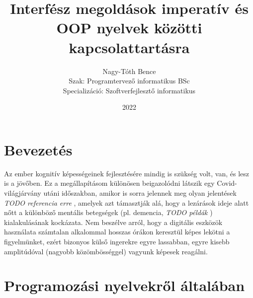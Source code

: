 \documentclass[tocnopagenum]{thesis-ekf}
\theoremstyle{definition}
\theoremstyle{remark}
\begin{document}
	\title{Interfész megoldások imperatív és OOP nyelvek közötti kapcsolattartásra}
	\author{Nagy-Tóth Bence\\Szak: Programtervező informatikus BSc\\Specializáció: Szoftverfejlesztő informatikus}
	\date{2022}
	\maketitle
	\tableofcontents
	
	\chapter*{Bevezetés}
	Az ember kognitív képességeinek fejlesztésére mindig is szükség volt, van, és lesz is a jövőben. Ez a megállapításom különösen beigazolódni látszik egy Covid-világjárvány utáni időszakban, amikor is sorra jelennek meg olyan jelentések \emph{TODO referencia erre}
	, amelyek azt támasztják alá, hogy a lezárások ideje alatt nőtt a különböző mentális betegségek (pl. demencia, \emph{TODO példák}
	) kialakulásának kockázata. Nem beszélve arról, hogy a digitális eszközök használata számtalan alkalommal hosszas órákon keresztül képes lekötni a figyelmünket, ezért bizonyos külső ingerekre egyre lassabban, egyre kisebb amplitúdóval (nagyobb közömbösséggel) vagyunk képesek reagálni.
	\chapter{Programozási nyelvekről általában}
\end{document}
